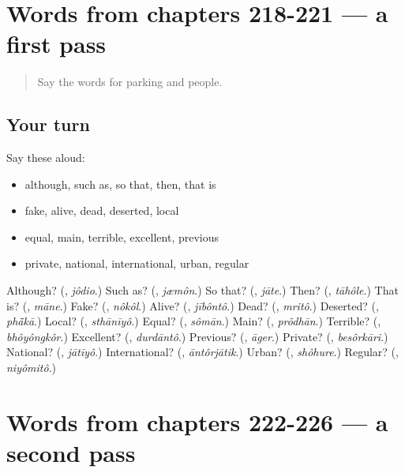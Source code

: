 \section[(dialogue)]{Words from chapters 218-221 — a first pass}

\label{lesson:BN-R226-first-pass-words-from-chapters-218-221}



\begin{quote}
Say the words for parking and people.
\end{quote}

\subsection*{Your turn}
Say these aloud:

\begin{itemize}
\raggedright
  \item although, such as, so that, then, that is
  \item fake, alive, dead, deserted, local
  \item equal, main, terrible, excellent, previous
  \item private, national, international, urban, regular
\end{itemize}

\begin{tcolorbox}[breakable,colback=teal!4,colframe=teal!35!black,title={Before you move on}]
Although? (\textbf{}, \emph{jôdio}.) Such as? (\textbf{}, \emph{jæmôn}.) So that? (\textbf{}, \emph{jāte}.) Then? (\textbf{}, \emph{tāhôle}.) That is? (\textbf{}, \emph{māne}.) Fake? (\textbf{}, \emph{nôkôl}.) Alive? (\textbf{}, \emph{jībôntô}.) Dead? (\textbf{}, \emph{mritô}.) Deserted? (\textbf{}, \emph{phā̃kā}.) Local? (\textbf{}, \emph{sthānīyô}.) Equal? (\textbf{}, \emph{sômān}.) Main? (\textbf{}, \emph{prôdhān}.) Terrible? (\textbf{}, \emph{bhôyôngkôr}.) Excellent? (\textbf{}, \emph{durdāntô}.) Previous? (\textbf{}, \emph{āger}.) Private? (\textbf{}, \emph{besôrkāri}.) National? (\textbf{}, \emph{jātīyô}.) International? (\textbf{}, \emph{āntôrjātik}.) Urban? (\textbf{}, \emph{shôhure}.) Regular? (\textbf{}, \emph{niyômitô}.)
\end{tcolorbox}
\section[(dialogue)]{Words from chapters 222-226 — a second pass}

